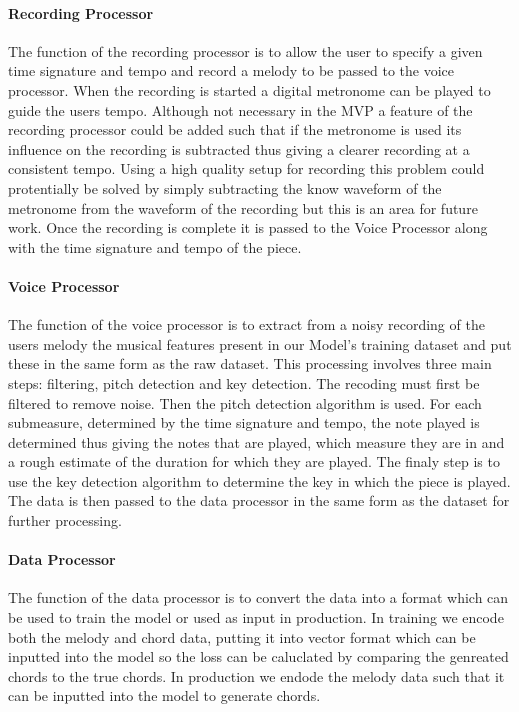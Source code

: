 \paragraph{Recording Processor}

The function of the recording processor is to allow the user to specify a given time signature and tempo and record a melody to be passed to the voice processor.
When the recording is started a digital metronome can be played to guide the users tempo. 
Although not necessary in the MVP a feature of the recording processor could be added such that if the metronome is used its influence on the recording is subtracted thus giving a clearer recording at a consistent tempo.
Using a high quality setup for recording this problem could protentially be solved by simply subtracting the know waveform of the metronome from the waveform of the recording but this is an area for future work.
Once the recording is complete it is passed to the Voice Processor along with the time signature and tempo of the piece.

\paragraph{Voice Processor}

The function of the voice processor is to extract from a noisy recording of the users melody the musical features present in our Model's training dataset and put these in the same form as the raw dataset.
This processing involves three main steps: filtering, pitch detection and key detection.
The recoding must first be filtered to remove noise.
Then the pitch detection algorithm is used.
For each submeasure, determined by the time signature and tempo, the note played is determined thus giving the notes that are played, which measure they are in and a rough estimate of the duration for which they are played.
The finaly step is to use the key detection algorithm to determine the key in which the piece is played.
The data is then passed to the data processor in the same form as the dataset for further processing.

\paragraph{Data Processor}

The function of the data processor is to convert the data into a format which can be used to train the model or used as input in production.
In training we encode both the melody and chord data, putting it into vector format which can be inputted into the model so the loss can be caluclated by comparing the genreated chords to the true chords.
In production we endode the melody data such that it can be inputted into the model to generate chords.

